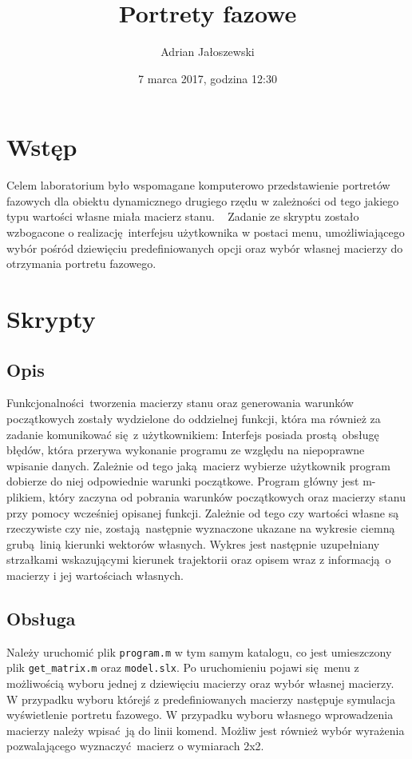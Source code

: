 \documentclass[a4paper, 12pt]{article}
\title{Portrety fazowe}
\author{Adrian Jałoszewski}
\date{7 marca 2017, godzina 12:30}
\begin{document}
	\lstset{language=Matlab, basicstyle=\footnotesize,
		keepspaces=true,frame=single,tabsize=4}
	\maketitle
	\section{Wstęp}
		Celem laboratorium było wspomagane komputerowo przedstawienie portretów fazowych dla obiektu dynamicznego drugiego rzędu w zależności od tego jakiego typu wartości własne miała macierz stanu.
		\newline
		\newline 
		Zadanie ze skryptu zostało wzbogacone o realizację interfejsu użytkownika w postaci menu, umożliwiającego wybór pośród dziewięciu predefiniowanych opcji oraz wybór własnej macierzy do otrzymania portretu fazowego.
	\section{Skrypty}
		\subsection{Opis}
			Funkcjonalności tworzenia macierzy stanu oraz generowania warunków początkowych zostały wydzielone do oddzielnej funkcji, która ma również za zadanie komunikować się z użytkownikiem:
			\newline \newline
			Interfejs posiada prostą obsługę błędów, która przerywa wykonanie programu ze względu na niepoprawne wpisanie danych. Zależnie od tego jaką macierz wybierze użytkownik program dobierze do niej odpowiednie warunki początkowe. Program główny jest m-plikiem, który zaczyna od pobrania warunków początkowych oraz macierzy stanu przy pomocy wcześniej opisanej funkcji.
			\newline \newline
			Zależnie od tego czy wartości własne są rzeczywiste czy nie, zostają następnie wyznaczone ukazane na wykresie ciemną grubą linią kierunki wektorów własnych.
			Wykres jest następnie uzupełniany strzałkami wskazującymi kierunek trajektorii oraz opisem wraz z informacją o macierzy i jej wartościach własnych.
		\subsection{Obsługa}
			Należy uruchomić plik \texttt{program.m} w tym samym katalogu, co jest umieszczony plik \texttt{get\_matrix.m} oraz \texttt{model.slx}. Po uruchomieniu pojawi się menu z możliwością wyboru jednej z dziewięciu macierzy oraz wybór własnej macierzy. W przypadku wyboru którejś z predefiniowanych macierzy następuje symulacja wyświetlenie portretu fazowego. W przypadku wyboru własnego wprowadzenia macierzy należy wpisać ją do linii komend. Możliw jest również wybór wyrażenia pozwalającego wyznaczyć macierz o wymiarach 2x2. 
\end{document}
